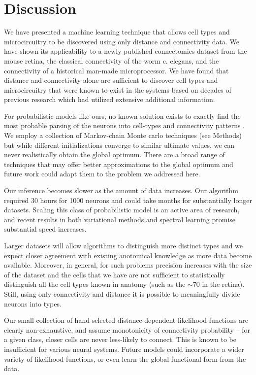 \documentclass{article}
\begin{document}
\section{Discussion}
We have presented a machine learning technique that allows cell types
and microcircuitry to be discovered using only distance and
connectivity data. We have shown its applicability to a newly
published connectomics dataset from the mouse retina, the classical
connectivity of the worm c. elegans, and the connectivity of a
historical man-made microprocessor. We have found that distance and
connectivity alone are sufficient to discover cell types and
microcircuitry that were known to exist in the systems based on decades
of previous research which had utilized extensive additional
information.

For probabilistic models like ours, no known solution exists to
exactly find the most probable parsing of the neurons into cell-types
and connectivity patterns . We employ a collection of Markov-chain
Monte carlo techniques (see Methods) but while different
initializations converge to similar ultimate values, we can never
realistically obtain the global optimum. There are a broad range of
techniques that may offer better approximations to the global optimum
\autocite{Wanga2012} and future work could adapt them to
the problem we addressed here.

Our inference becomes slower as the amount of data increases. Our
algorithm required 30 hours for 1000 neurons and could take months for
substantially longer datasets. Scaling this class of probabilistic
model is an active area of research, and recent results in both
variational methods \autocite{Hoffman2013} and spectral learning
  \autocite{Anandkumar2012} promise substantial speed increases.

  Larger datasets will allow algorithms to distinguish more distinct
  types  and we expect closer agreement
  with existing anotomical knowledge as more data become available.
  Moreover, in general, for such problems precision increases with the
  size of the dataset and the cells that we have are not sufficient to
  statistically distinguish all the cell types known in anatomy (such
  as the $\sim 70$ in the retina). Still, using only connectivity and
  distance it is possible to meaningfully divide neurons into types.

Our small collection of hand-selected distance-dependent likelihood
functions are clearly non-exhaustive, and assume monotonicity
of connectivity probability -- for a given class, closer cells
are never less-likely to connect. This is known to be insufficient
for various neural systems. Future models could incorporate
a wider variety of likelihood functions, or even learn the global
functional form from the data. 
\end{document}
